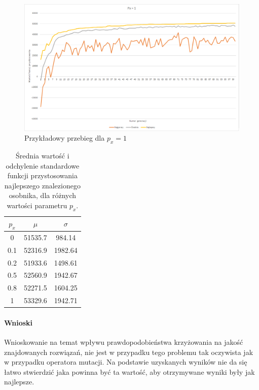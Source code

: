 \documentclass{article}
\begin{document}
	\begin{figure}[H]
		\centering
		\includegraphics[width=1\linewidth]{cross1.png}
		\caption{Przykładowy przebieg dla $p_x=1$}
		\label{fig:px1}
	\end{figure}

	\begin{table}[H]
		\begin{center}
			\begin{tabular}{ |c|c|c| } 
				\hline
				$p_x$ & $\mu$ & $\sigma$ \\ 
				\hline
				0 & 51535.7 & 984.14 \\ 
				0.1 & 52316.9 & 1982.64 \\ 
				0.2 & 51933.6 & 1498.61 \\ 
				0.5 & 52560.9 & 1942.67 \\ 
				0.8 & 52271.5 & 1604.25 \\ 
				1 & 53329.6 & 1942.71 \\ 
				\hline
			\end{tabular}
			\caption{Średnia wartość i odchylenie standardowe funkcji przystosowania najlepszego znalezionego osobnika, dla różnych wartości parametru $p_x$.}
			\label{tab:cross}
		\end{center}
	\end{table}
	
	\paragraph{Wnioski}
	Wnioskowanie na temat wpływu prawdopodobieństwa krzyżowania na jakość znajdowanych rozwiązań, nie jest w przypadku tego problemu tak oczywista jak w przypadku operatora mutacji. Na podstawie uzyskanych wyników nie da się łatwo stwierdzić jaka powinna być ta wartość, aby otrzymywane wyniki były jak najlepsze.
	
\end{document}
